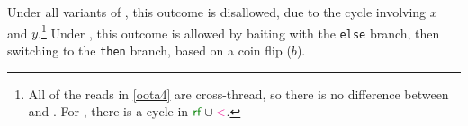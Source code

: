 Under all variants of \PwT{}, this outcome is disallowed, due to the cycle
involving $x$ and $y$.\footnote{All of the reads in \ref{oota4} are
  cross-thread, so there is no difference between  and .
  For \PwTc, there is a cycle in ${\rrfx}\cup{\lt}$.}  Under \PS{}, this
outcome is allowed by {baiting} with the \texttt{else} branch, then
{switching} to the \texttt{then} branch, based on a coin flip (${b}$).

